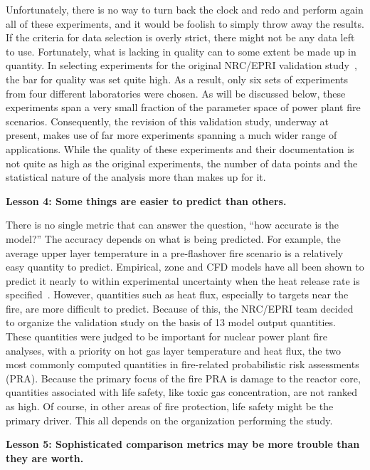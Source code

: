 \documentclass[fleqn,b5paper]{article}
\begin{document}
Unfortunately, there is no way to turn back the clock and redo and perform again all of these experiments, and it would be foolish to simply throw away the results. If the criteria for data selection is overly strict, there might not be any data left to use. Fortunately, what is lacking in quality can to some extent be made up in quantity. In selecting experiments for the original NRC/EPRI validation study~\cite{NUREG_1824}, the bar for quality was set quite high. As a result, only six sets of experiments from four different laboratories were chosen. As will be discussed below, these experiments span a very small fraction of the parameter space of power plant fire scenarios. Consequently, the revision of this validation study, underway at present, makes use of far more experiments spanning a much wider range of applications. While the quality of these experiments and their documentation is not quite as high as the original experiments, the number of data points and the statistical nature of the analysis more than makes up for it.



\vspace{\parskip}
{\bf Lesson 4: Some things are easier to predict than others.}

There is no single metric that can answer the question, ``how accurate is the model?'' The accuracy depends on what is being predicted. For example, the average upper layer temperature in a pre-flashover fire scenario is a relatively easy quantity to predict. Empirical, zone and CFD models have all been shown to predict it nearly to within experimental uncertainty when the heat release rate is specified~\cite{NUREG_1824}. However, quantities such as heat flux, especially to targets near the fire, are more difficult to predict. Because of this, the NRC/EPRI team decided to organize the validation study on the basis of 13 model output quantities. These quantities were judged to be important for nuclear power plant fire analyses, with a priority on hot gas layer temperature and heat flux, the two most commonly computed quantities in fire-related probabilistic risk assessments (PRA). Because the primary focus of the fire PRA is damage to the reactor core, quantities associated with life safety, like toxic gas concentration, are not ranked as high. Of course, in other areas of fire protection, life safety might be the primary driver. This all depends on the organization performing the study.


\vspace{\parskip}
{\bf Lesson 5: Sophisticated comparison metrics may be more trouble than they are worth.}
\end{document}
